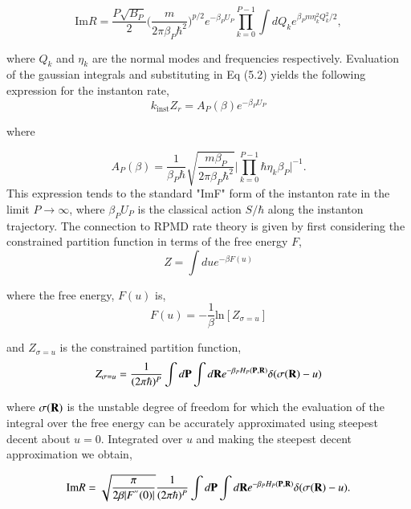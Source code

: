 \documentclass[phd,tocprelim]{cornell}
\begin{document}
 \begin{equation}
 \textrm{Im} R = \frac{P\sqrt{B_P}}{2}\bigg( \frac{m}{2\pi\beta_P \hbar^2}\bigg)^{p/2} e^{-\beta_P U_P} \prod_{k=0}^{P-1} \int dQ_k e^{\beta_P m \eta_k^2 Q_k^2/2},
 \end{equation}
 
 
 where $Q_k$ and $\eta_k$ are the normal modes and frequencies respectively. Evaluation of the gaussian integrals and substituting in Eq (5.2) yields the following expression for the instanton rate,
 \begin{equation}
 k_{\textrm{inst}}Z_r = A_P(\beta) e^{-\beta_P U_P}
 \end{equation}
 
 where

 \begin{equation}
 A_P(\beta) = \frac{1}{\beta_P \hbar} \sqrt{\frac{m\beta_P}{2\pi \beta_P \hbar^2}} \bigg| \prod_{k=0}^{P-1} \hbar \eta_k \beta_P \bigg|^{-1}.
 \end{equation}
 This expression tends to the standard "ImF" form of the instanton rate in the limit $P\to \infty$, where $\beta_P U_P$ is the classical action $ S/\hbar$ along the instanton trajectory.  
 The connection to RPMD rate theory is given by first considering the constrained partition function in terms of the free energy $F$,
 \begin{equation}
 Z= \int du e^{-\beta F(u)} 
 \end{equation}
 
 where the free energy, $F(u)$ is,
  \begin{equation}
  F(u)=-\frac{1}{\beta} \textrm{ln} [Z_{\sigma=u}]
  \end{equation} 
  
  and $Z_{\sigma=u}$ is the constrained partition function, 
\begin{equation}
Z_{\sigma=u}  = \frac{1}{(2\pi \hbar)^P} \int d {\bf{P}}  \int d {\bf{R}} e^{-\beta_P H_P( {\bf{P}}, {\bf{R}})} \delta(\sigma( {\bf{R}})-u)
  \end{equation}    
  
  where $ \sigma( {\bf{R}})$ is the unstable degree of freedom for which the evaluation of the integral over the free energy can be accurately approximated using steepest decent about $u=0$. Integrated over $u$ and making the steepest decent approximation we obtain, 
  
\begin{equation}
 \textrm{Im} R =\sqrt{\frac{\pi}{2\beta |F^{''}(0)|}} \frac{1}{(2\pi \hbar)^P} \int d {\bf{P}}  \int d {\bf{R}} e^{-\beta_P H_P( {\bf{P}}, {\bf{R}})} \delta(\sigma( {\bf{R}})-u).
 \end{equation}  
   
\end{document}
